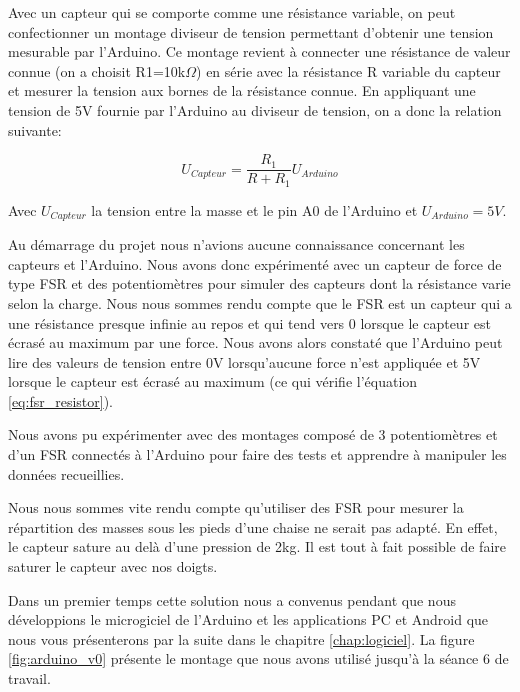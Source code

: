\documentclass{polytech/polytech}
\begin{document}
Avec un capteur qui se comporte comme une résistance variable, on peut confectionner un montage diviseur de tension permettant d'obtenir une tension mesurable par l'Arduino. Ce montage revient à connecter une résistance de valeur connue (on a choisit R1=10k$\Omega$) en série avec la résistance R variable du capteur et mesurer la tension aux bornes de la résistance connue.  En appliquant une tension de 5V fournie par l'Arduino au diviseur de tension, on a donc la relation suivante:

\begin{equation}
\label{eq:fsr_resistor}
U_{Capteur}= \frac{R_1}{ R + R_1} U_{Arduino} 
\end{equation}
 
 Avec $U_{Capteur}$ la tension entre la masse et le pin A0 de l'Arduino et $U_{Arduino}=5V$.
 
Au démarrage du projet nous n'avions aucune connaissance concernant les capteurs et l'Arduino. Nous avons donc expérimenté avec un capteur de force de type FSR et des potentiomètres pour simuler des capteurs dont la résistance varie selon la charge. Nous nous sommes rendu compte que le FSR est un capteur qui a une résistance presque infinie au repos et qui tend vers 0 lorsque le capteur est écrasé au maximum par une force. Nous avons alors constaté que l'Arduino peut lire des valeurs de tension entre 0V lorsqu'aucune force n'est appliquée et 5V lorsque le capteur est écrasé au maximum (ce qui vérifie l'équation \eqref{eq:fsr_resistor}).

Nous avons pu expérimenter avec des montages composé de 3 potentiomètres et d'un FSR connectés à l'Arduino pour faire des tests et apprendre à manipuler les données recueillies.

Nous nous sommes vite rendu compte qu'utiliser des FSR pour mesurer la répartition des masses sous les pieds d'une chaise ne serait pas adapté. En effet, le capteur sature au delà d'une pression de 2kg. Il est tout à fait possible de faire saturer le capteur avec nos doigts.

Dans un premier temps cette solution nous a convenus pendant que nous développions le microgiciel de l'Arduino et les applications PC et Android que nous vous présenterons par la suite dans le chapitre \ref{chap:logiciel}. La figure \ref{fig:arduino_v0} présente le montage que nous avons utilisé jusqu'à la séance 6 de travail.
\end{document}

